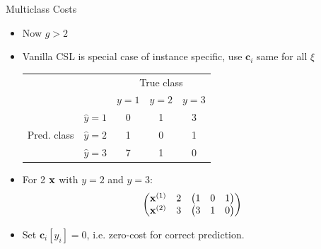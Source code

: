 \documentclass[11pt,compress,t,notes=noshow, xcolor=table]{beamer}
\newcommand{\cv}{\mathbf{c}}    %
\begin{document}
\begin{vbframe}{Multiclass Costs}
    \begin{itemize}
        \footnotesize
        \item Now $g > 2$

        \item Vanilla CSL is special case of instance specific, use $\cv_i$ same for all $\xi$
        
        \vspace{5pt}
        \begin{center}
                            \begin{tabular}{cc|ccc}
        			& &\multicolumn{3}{c}{True class} \\
        			& & $y=1$ & $y=2$ & $y=3$  \\
        			\hline
        			\multirow{3}{*}{\parbox{0.6cm}{Pred.  class}} & $\hat y=1$ & 0 & 1 & 3\\
        			& $\hat y=2$ & 1 & 0 & 1\\
                        & $\hat y=3$ & 7 & 1 & 0\\
                \end{tabular}
        \end{center}
        \vspace{5pt}
        
        \item For 2 $\mathbf{x}$ with $y=2$ and $y = 3$: %
          \begin{equation*}
            \begin{aligned}
                \begin{pmatrix} 
                    \mathbf{x}^{(1)} & 2 & \begin{pmatrix} 1 & 0 & 1 \end{pmatrix} \\
                    \mathbf{x}^{(2)} & 3 & \begin{pmatrix} 3 & 1 & 0 \end{pmatrix} \\
                 \end{pmatrix}
            \end{aligned}
        \end{equation*}
        \item Set $\cv_i[y_i] = 0$, i.e. zero-cost for correct prediction.
        \vspace{5pt}
        
            
    \end{itemize}
\end{vbframe}
\end{document}
